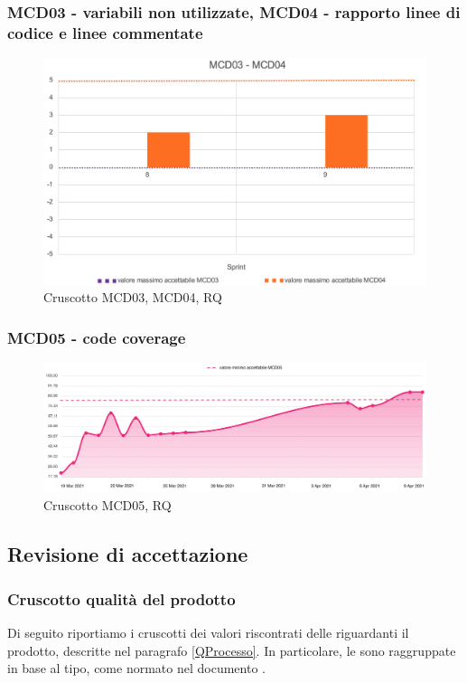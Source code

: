 \subsubsection*{MCD03 - variabili non utilizzate, MCD04 - rapporto linee di codice e linee commentate}
\begin{figure}[H] 
    \centering
    \includegraphics[scale = 0.6]{immagini/MCD03-04.png}
    \caption{Cruscotto MCD03, MCD04, RQ}
\end{figure}

\subsubsection*{MCD05 - code coverage}
\begin{figure}[H] 
    \centering
    \includegraphics[scale = 0.4]{immagini/MCD05.png}
    \caption{Cruscotto MCD05, RQ}
\end{figure}

\newpage

\subsection{Revisione di accettazione}
\subsubsection{Cruscotto qualità del prodotto}
Di seguito riportiamo i cruscotti dei valori riscontrati delle  riguardanti il prodotto, descritte nel paragrafo \ref{QProcesso}. In particolare, le  sono raggruppate in base al tipo, come normato nel documento \NdP{}.
